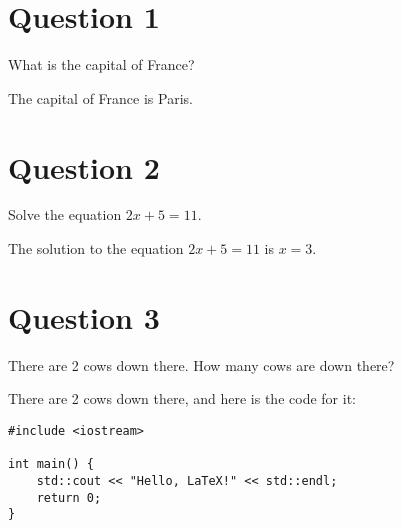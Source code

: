 \documentclass{article}
\begin{document}
\titlepageformat %

\begin{titlepage}
  \centering
  \vspace*{2cm}
  \textcolor{blacktitle}{}\par
  \vspace{0.5cm}
  \textcolor{blacktitle}{}
\end{titlepage}

\ClearShipoutPictureBG

\section*{Question 1}
\begin{questionbox}
What is the capital of France?
\end{questionbox}

\begin{solutionbox}
  The capital of France is Paris.
\end{solutionbox}

\section*{Question 2}
\begin{questionbox}
Solve the equation $2x + 5 = 11$.
\end{questionbox}

\begin{solutionbox}
  The solution to the equation $2x + 5 = 11$ is $x = 3$.
\end{solutionbox}

\section*{Question 3}
\begin{questionbox}
There are 2 cows down there. How many cows are down there?
\end{questionbox}

\begin{solutionbox}
  There are 2 cows down there, and here is the code for it:
\end{solutionbox}

\begin{codebox}
\begin{verbatim}
#include <iostream>

int main() {
    std::cout << "Hello, LaTeX!" << std::endl;
    return 0;
}
\end{verbatim}
\end{codebox}
\end{document}
